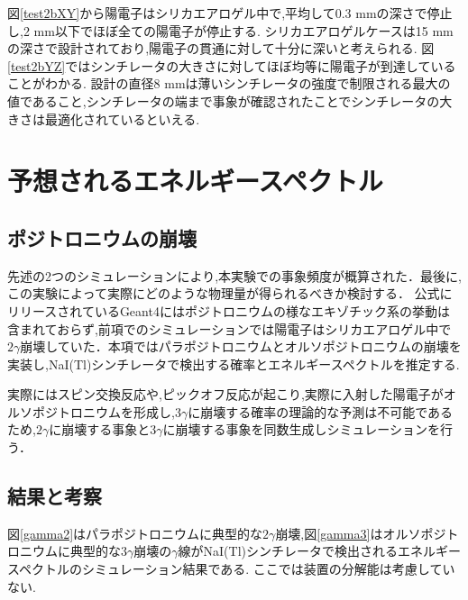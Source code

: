 図\ref{test2bXY}から陽電子はシリカエアロゲル中で,平均して0.3 mmの深さで停止し,2 mm以下でほぼ全ての陽電子が停止する.
シリカエアロゲルケースは15 mmの深さで設計されており,陽電子の貫通に対して十分に深いと考えられる.
図\ref{test2bYZ}ではシンチレータの大きさに対してほぼ均等に陽電子が到達していることがわかる.
設計の直径8 mmは薄いシンチレータの強度で制限される最大の値であること,シンチレータの端まで事象が確認されたことでシンチレータの大きさは最適化されているといえる.


\section{予想されるエネルギースペクトル}
\label{section_test3}

\subsection{ポジトロニウムの崩壊}

先述の2つのシミュレーションにより,本実験での事象頻度が概算された．最後に,この実験によって実際にどのような物理量が得られるべきか検討する．
公式にリリースされているGeant4にはポジトロニウムの様なエキゾチック系の挙動は含まれておらず,前項でのシミュレーションでは陽電子はシリカエアロゲル中で$2\gamma$崩壊していた．本項ではパラポジトロニウムとオルソポジトロニウムの崩壊を実装し,NaI(Tl)シンチレータで検出する確率とエネルギースペクトルを推定する.

実際にはスピン交換反応や,ピックオフ反応が起こり,実際に入射した陽電子がオルソポジトロニウムを形成し,$3\gamma$に崩壊する確率の理論的な予測は不可能であるため,$2\gamma$に崩壊する事象と$3\gamma$に崩壊する事象を同数生成しシミュレーションを行う．

\subsection{結果と考察}

図\ref{gamma2}はパラポジトロニウムに典型的な$2\gamma$崩壊,図\ref{gamma3}はオルソポジトロニウムに典型的な$3\gamma$崩壊の$\gamma$線がNaI(Tl)シンチレータで検出されるエネルギースペクトルのシミュレーション結果である.
ここでは装置の分解能は考慮していない.

